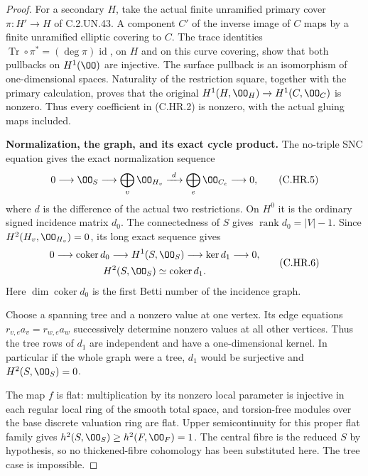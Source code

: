 \begin{proof}
For a secondary $H$, take the actual finite unramified primary
cover $\pi:H'\to H$ of C.2.UN.43. A component $C'$ of the inverse
image of $C$ maps by a finite unramified elliptic covering to $C$.
The trace identities
$\operatorname{Tr}\circ\pi^*=(\deg\pi)\operatorname{id}$, on $H$
and on this curve covering, show that both pullbacks on $H^1(\OO)$
are injective. The surface pullback is an isomorphism of
one-dimensional spaces. Naturality of the restriction square,
together with the primary calculation, proves that the original
$H^1(H,\OO_H)\to H^1(C,\OO_C)$ is nonzero. Thus every coefficient
in (C.HR.2) is nonzero, with the actual gluing maps included.

\par\medskip\noindent\textbf{Normalization, the graph, and its exact cycle product.}
The no-triple SNC equation gives the exact normalization sequence
\[
 0\longrightarrow\OO_S
 \longrightarrow\bigoplus_v\OO_{H_v}
 \xrightarrow{\ d\ }\bigoplus_e\OO_{C_e}
 \longrightarrow0,                                    \tag{C.HR.5}
\]
where $d$ is the difference of the actual two restrictions. On
$H^0$ it is the ordinary signed incidence matrix $d_0$. The
connectedness of $S$ gives $\operatorname{rank}d_0=|V|-1$.
Since $H^2(H_v,\OO_{H_v})=0$, its long exact sequence gives
\[
 \begin{gathered}
 0\longrightarrow\operatorname{coker}d_0
 \longrightarrow H^1(S,\OO_S)
 \longrightarrow\ker d_1\longrightarrow0,\\
             H^2(S,\OO_S)\simeq\operatorname{coker}d_1.
 \end{gathered}                                        \tag{C.HR.6}
\]
Here $\dim\operatorname{coker}d_0$ is the first Betti number of
the incidence graph.

Choose a spanning tree and a nonzero value at one vertex.
Its edge equations $r_{v,e}a_v=r_{w,e}a_w$ successively determine
nonzero values at all other vertices. Thus the tree rows of $d_1$
are independent and have a one-dimensional kernel. In particular
if the whole graph were a tree, $d_1$ would be surjective and
$H^2(S,\OO_S)=0$.

The map $f$ is flat: multiplication by its nonzero local parameter
is injective in each regular local ring of the smooth total space,
and torsion-free modules over the base discrete valuation ring
are flat. Upper semicontinuity for this proper flat family gives
$h^2(S,\OO_S)\ge h^2(F,\OO_F)=1$. The central fibre is the
reduced $S$ by hypothesis, so no thickened-fibre cohomology has
been substituted here. The tree case is impossible.


\end{proof}
